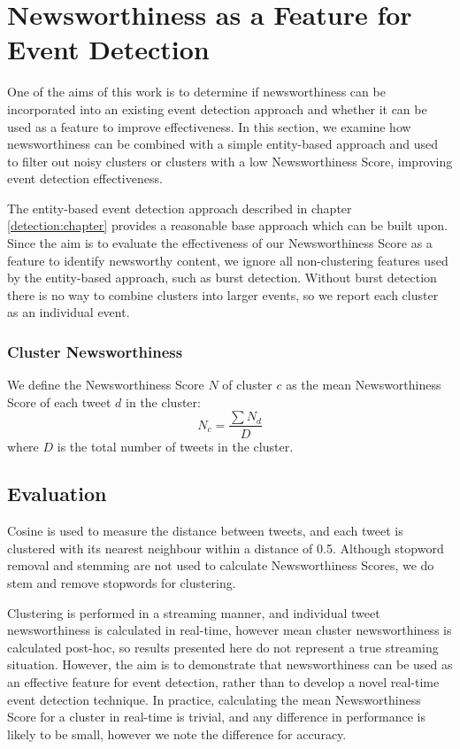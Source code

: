 
\section{Newsworthiness as a Feature for Event Detection}
\label{scoring:sec:detection}

One of the aims of this work is to determine if newsworthiness can be incorporated into an existing event detection approach and whether it can be used as a feature to improve effectiveness.
In this section, we examine how newsworthiness can be combined with a simple entity-based approach and used to filter out noisy clusters or clusters with a low Newsworthiness Score, improving event detection effectiveness.

The entity-based event detection approach described in chapter \ref{detection:chapter} provides a reasonable base approach which can be built upon.
Since the aim is to evaluate the effectiveness of our Newsworthiness Score as a feature to identify newsworthy content, we ignore all non-clustering features used by the entity-based approach, such as burst detection.
Without burst detection there is no way to combine clusters into larger events, so we report each cluster as an individual event.

\subsubsection{Cluster Newsworthiness}

We define the Newsworthiness Score \(N\) of cluster \(c\) as the mean Newsworthiness Score of each tweet \(d\) in the cluster:
\begin{equation}
	N_c = \frac{\sum{N_d}}{D}
\end{equation}
where \(D\) is the total number of tweets in the cluster.

\subsection{Evaluation}
\label{scoring:sec:detectionEval}

Cosine is used to measure the distance between tweets, and each tweet is clustered with its nearest neighbour within a distance of 0.5.
Although stopword removal and stemming are not used to calculate Newsworthiness Scores, we do stem and remove stopwords for clustering.

Clustering is performed in a streaming manner, and individual tweet newsworthiness is calculated in real-time, however mean cluster newsworthiness is calculated post-hoc, so results presented here do not represent a true streaming situation.
However, the aim is to demonstrate that newsworthiness can be used as an effective feature for event detection, rather than to develop a novel real-time event detection technique.
In practice, calculating the mean Newsworthiness Score for a cluster in real-time is trivial, and any difference in performance is likely to be small, however we note the difference for accuracy.

